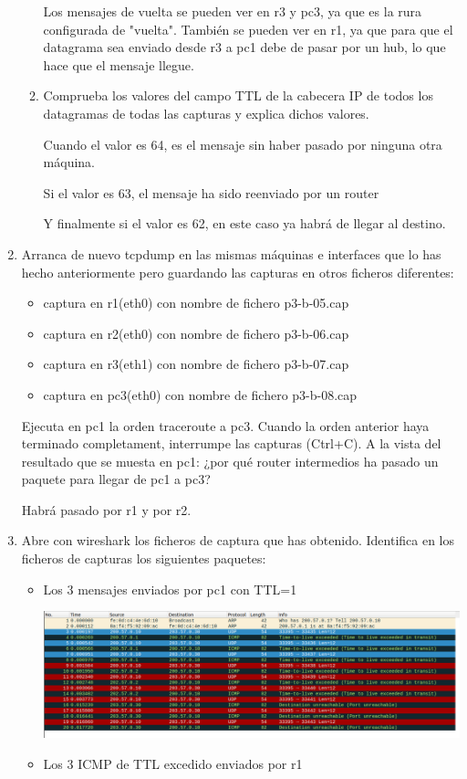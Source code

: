 \documentclass[12pt, a4paper]{report}
\begin{document}
\begin{enumerate}
\begin{enumerate}[label=\alph*]
		Los mensajes de vuelta se pueden ver en r3 y pc3, ya que es la rura configurada de "vuelta". También se pueden ver en r1, ya que para que el datagrama sea enviado desde r3 a pc1 debe de pasar por un hub, lo que hace que el mensaje llegue.
		\item Comprueba los valores del campo TTL de la cabecera IP de todos los datagramas de todas las capturas
		y explica dichos valores.
		
		Cuando el valor es 64, es el mensaje sin haber pasado por ninguna otra máquina.
		
		Si el valor es 63, el mensaje ha sido reenviado por un router
		
		Y finalmente si el valor es 62, en este caso ya habrá de llegar al destino.
	\end{enumerate}
	\item Arranca de nuevo
	tcpdump en las mismas máquinas e interfaces que lo has hecho anteriormente pero guardando
	las capturas en otros ficheros diferentes:
	\begin{itemize}
		\item captura en r1(eth0) con nombre de fichero \color{blue} p3-b-05.cap \color{black}
		\item captura en r2(eth0) con nombre de fichero \color{blue} p3-b-06.cap \color{black}
		\item captura en r3(eth1) con nombre de fichero \color{blue} p3-b-07.cap \color{black}
		\item captura en pc3(eth0) con nombre de fichero \color{blue} p3-b-08.cap \color{black}	
	\end{itemize}
	Ejecuta en
	pc1
	la orden
	traceroute
	a
	pc3.\newline
	Cuando la orden anterior haya terminado completament, interrumpe las capturas (Ctrl+C).
	A la vista del resultado que se muesta en
	pc1: ¿por qué router
	intermedios ha pasado un paquete para llegar
	de
	pc1
	a
	pc3?
	
	Habrá pasado por r1 y por r2.
	\item Abre con
	wireshark
	los ficheros de captura que has obtenido. Identifica en los ficheros de capturas los
	siguientes paquetes:
	\begin{itemize}
		\item Los 3 mensajes enviados por pc1 con TTL=1
		
		\includegraphics*[width=128mm, scale=0.5, center]{mensajes1}
		\item Los 3 ICMP de TTL excedido enviados por r1
		

\end{itemize}
\end{enumerate}
\end{document}
